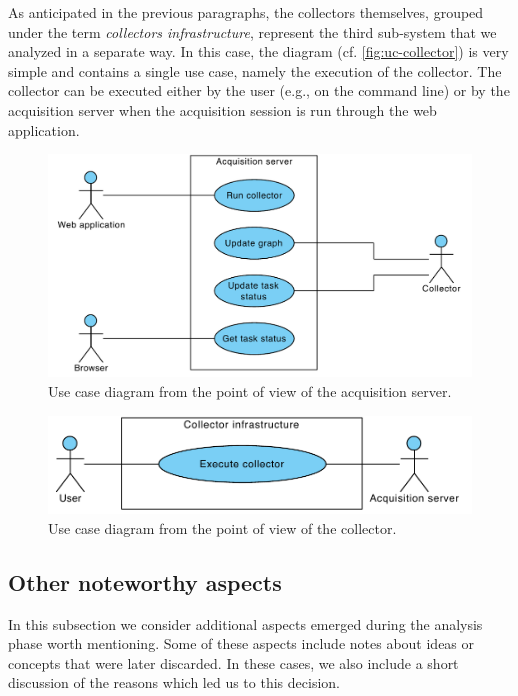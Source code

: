 As anticipated in the previous paragraphs, the collectors themselves, grouped under the term \emph{collectors infrastructure}, represent the third sub-system that we analyzed in a separate way. In this case, the diagram (cf. \vref{fig:uc-collector}) is very simple and contains a single use case, namely the execution of the collector. The collector can be executed either by the user (e.g., on the command line) or by the acquisition server when the acquisition session is run through the web application.

\begin{figure}[p]
  \centering
  \includegraphics[width=0.75\linewidth]{images/diagrams/uc-server}
  \caption[Use case diagram for the acquisition server.]{Use case diagram from the point of view of the acquisition server.}
  \label{fig:uc-server}
\end{figure}

\begin{figure}[p]
  \centering
  \includegraphics[width=0.67\linewidth]{images/diagrams/uc-collector}
  \caption[Use case diagram for the collector.]{Use case diagram from the point of view of the collector.}
  \label{fig:uc-collector}
\end{figure}


\subsection{Other noteworthy aspects}

In this subsection we consider additional aspects emerged during the analysis phase worth mentioning. Some of these aspects include notes about ideas or concepts that were later discarded. In these cases, we also include a short discussion of the reasons which led us to this decision.

